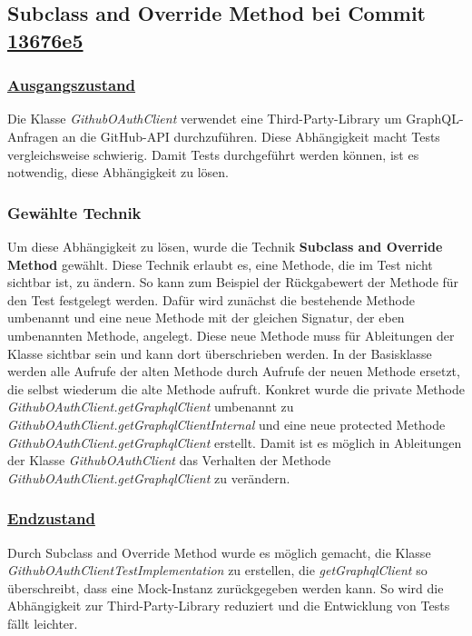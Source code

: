 \newpage

\subsection{Subclass and Override Method bei Commit \href{https://github.com/lukaspanni/OpenSourceStats/commit/13676e52a506bd02a06fa26087c93b2620ccd3c2} {13676e5}}

\subsubsection*{\href{https://github.com/lukaspanni/OpenSourceStats/tree/9385bb4b9e20b5503e3ea72acd392185f0c533db/app/src/main/java/de/lukaspanni/opensourcestats/client}{Ausgangszustand}}

Die Klasse \textit{GithubOAuthClient} verwendet eine Third-Party-Library um GraphQL-Anfragen an die GitHub-API durchzuführen.
Diese Abhängigkeit macht Tests vergleichsweise schwierig.
Damit Tests durchgeführt werden können, ist es notwendig, diese Abhängigkeit zu lösen.

\subsubsection*{Gewählte Technik}
Um diese Abhängigkeit zu lösen, wurde die Technik \textbf{Subclass and Override Method} gewählt.
Diese Technik erlaubt es, eine Methode, die im Test nicht sichtbar ist, zu ändern.
So kann zum Beispiel der Rückgabewert der Methode für den Test festgelegt werden.
Dafür wird zunächst die bestehende Methode umbenannt und eine neue Methode mit der gleichen Signatur, der eben umbenannten Methode, angelegt.
Diese neue Methode muss für Ableitungen der Klasse sichtbar sein und kann dort überschrieben werden. 
In der Basisklasse werden alle Aufrufe der alten Methode durch Aufrufe der neuen Methode ersetzt, die selbst wiederum die alte Methode aufruft.
\newline
Konkret wurde die private Methode \textit{GithubOAuthClient.getGraphqlClient} umbenannt zu \textit{GithubOAuthClient.getGraphqlClientInternal} und eine neue protected Methode \textit{GithubOAuthClient.getGraphqlClient} erstellt.
Damit ist es möglich in Ableitungen der Klasse \textit{GithubOAuthClient} das Verhalten der Methode \textit{GithubOAuthClient.getGraphqlClient} zu verändern.

\subsubsection*{\href{https://github.com/lukaspanni/OpenSourceStats/tree/13676e52a506bd02a06fa26087c93b2620ccd3c2/app/src/main/java/de/lukaspanni/opensourcestats/client}{Endzustand}}
Durch Subclass and Override Method wurde es möglich gemacht, die Klasse \textit{GithubOAuthClientTestImplementation} zu erstellen, die \textit{getGraphqlClient} so überschreibt, dass eine Mock-Instanz zurückgegeben werden kann.
So wird die Abhängigkeit zur Third-Party-Library  reduziert und die Entwicklung von Tests fällt leichter.

